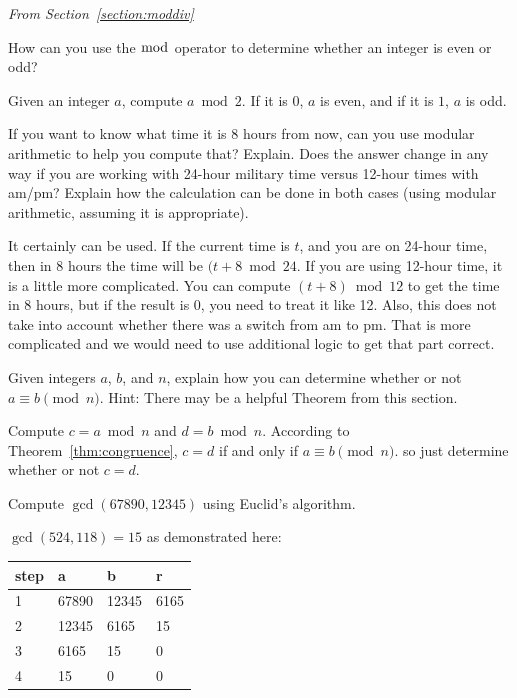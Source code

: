 \medskip
\noindent
{\em From Section~\ref{section:moddiv}}

\begin{requ}
How can you use the $\bmod$ operator to determine
whether an integer is even or odd?
\begin{requanswer}
Given an integer $a$, compute $a\bmod 2$.
If it is $0$, $a$ is even, and if it is $1$, $a$ is odd.
\end{requanswer}
\end{requ}


\begin{requ}
If you want to know what time it is 8 hours from now, can you use modular arithmetic to help you compute that?
Explain.
Does the answer change in any way if you are working with 24-hour military time versus 12-hour times with am/pm?
Explain how the calculation can be done in both cases (using modular arithmetic, assuming it is appropriate).
\begin{requanswer}
It certainly can be used. If the current time is $t$, and you are on 24-hour time, 
then in 8 hours the time will be $(t+8 \bmod 24$. If you are using 12-hour time, it is a little more complicated.
You can compute $(t+8)\bmod 12$ to get the time in 8 hours, but if the result is $0$, 
you need to treat it like 12. 
Also, this does not take into account whether there was a switch from am to pm.
That is more complicated and we would need to use additional logic to get that part correct.
\end{requanswer}
\end{requ}

\begin{requ}
Given integers $a$, $b$, and $n$, 
explain how you can determine whether or not 
$a\equiv b\pmod n$. Hint: There may be a helpful Theorem
from this section.
\begin{requanswer}
Compute $c=a\bmod n$ and $d=b\bmod n$.
According to Theorem~\ref{thm:congruence}, 
$c=d$ if and only if $a\equiv b\pmod n$. 
so just determine whether or not $c=d$.
\end{requanswer}
\end{requ}


\begin{requ}
Compute $\gcd(67890,12345)$ using Euclid's algorithm.
\begin{requanswer}
$\gcd(524,118)=15$ as demonstrated here: 

\begin{tabular}{|l|l|l|l|}
\hline
step&a&b&r\\
\hline
\hline
1&67890&12345&6165\\
\hline
2&12345&6165&15\\
\hline
3&6165&15&0\\
\hline
4&15&0&0\\
\hline
\end{tabular}
\end{requanswer}
\end{requ}

